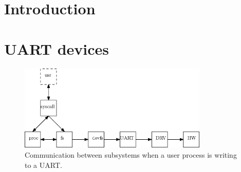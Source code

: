 \section{Introduction}


\section{UART devices}

\begin{figure}
  \center
  \includegraphics[width=9cm]{pics/uart}
  \caption{Communication between subsystems when a user process is writing to a UART.}
  \label{figure:dir}
\end{figure}

